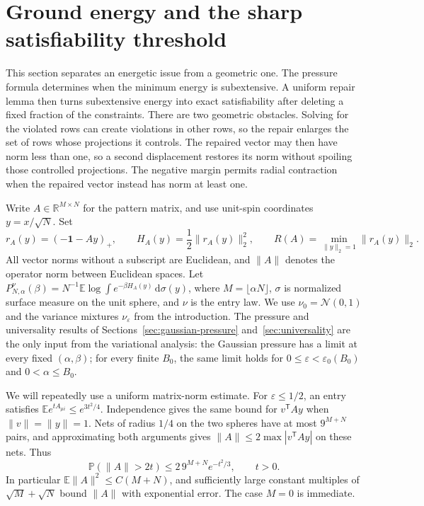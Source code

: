 \documentclass[11pt,a4paper]{article}
\numberwithin{equation}{section}
\theoremstyle{definition}
\theoremstyle{remark}
\newcommand{\E}{\mathbb E}
\newcommand{\Prob}{\mathbb P}
\newcommand{\R}{\mathbb R}
\newcommand{\dd}{\mathrm d}
\newcommand{\eps}{\varepsilon}
\begin{document}
\section{Ground energy and the sharp satisfiability threshold}
\label{sec:threshold}

This section separates an energetic issue from a geometric one.  The
pressure formula determines when the minimum energy is subextensive.  A
uniform repair lemma then turns subextensive energy into exact
satisfiability after deleting a fixed fraction of the constraints.
There are two geometric obstacles.  Solving for the violated rows can
create violations in other rows, so the repair enlarges the set of rows
whose projections it controls.  The repaired vector may then have norm
less than one, so a second displacement restores its norm without
spoiling those controlled projections.  The negative margin permits
radial contraction when the repaired vector instead has norm at least one.

Write $A\in\R^{M\times N}$ for the pattern matrix, and use unit-spin
coordinates $y=x/\sqrt N$.  Set
\[
 r_A(y)=(-\mathbf 1-Ay)_+,\qquad
 H_A(y)=\frac12\|r_A(y)\|_2^2,\qquad
 R(A)=\min_{\|y\|_2=1}\|r_A(y)\|_2.
\]
All vector norms without a subscript are Euclidean, and $\|A\|$ denotes
the operator norm between Euclidean spaces.  Let
$P_{N,\alpha}^{\nu}(\beta)=N^{-1}\E\log\int e^{-\beta H_A(y)}\,
\dd\sigma(y)$, where $M=\lfloor\alpha N\rfloor$, $\sigma$ is normalized
surface measure on the unit sphere, and $\nu$ is the entry law.  We use
$\nu_0=\mathcal N(0,1)$ and the variance mixtures $\nu_\eps$ from the
introduction.  The pressure and universality results of
Sections~\ref{sec:gaussian-pressure} and~\ref{sec:universality} are the
only input from the variational analysis: the Gaussian pressure has a
limit at every fixed $(\alpha,\beta)$; for every finite $B_0$, the same
limit holds for $0\leq\eps<\eps_0(B_0)$ and
$0<\alpha\leq B_0$.

We will repeatedly use a uniform matrix-norm estimate.  For
$\eps\leq1/2$, an entry satisfies
$\E e^{tA_{\mu i}}\leq e^{3t^2/4}$.  Independence gives the same bound
for $v^{\mathsf T}Ay$ when $\|v\|=\|y\|=1$.  Nets of radius $1/4$ on
the two spheres have at most $9^{M+N}$ pairs, and approximating both
arguments gives $\|A\|\leq2\max|v^{\mathsf T}Ay|$ on these nets.  Thus
\begin{equation}
 \Prob(\|A\|>2t)\leq2\,9^{M+N}e^{-t^2/3},\qquad t>0.
 \label{thresh:eq:operator-tail}
\end{equation}
In particular $\E\|A\|^2\leq C(M+N)$, and sufficiently large constant
multiples of $\sqrt M+\sqrt N$ bound $\|A\|$ with exponential error.
The case $M=0$ is immediate.
\end{document}
